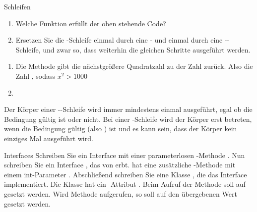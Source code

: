 \documentclass{../tuda-exercise}
\begin{document}
  \begin{task}[credit=\stars{1}{3}]{Schleifen}
    

    \begin{enumerate}
      [label=(\arabic*)]
      \item Welche Funktion erfüllt der oben stehende Code?
      \item Ersetzen Sie die -Schleife einmal durch eine - und
      einmal durch eine --Schleife, und zwar so, dass weiterhin
      die gleichen Schritte ausgeführt werden.
    \end{enumerate}

    \begin{solution}
      \begin{enumerate}
        [label=(\arabic*)]
        \item Die Methode gibt die nächstgrößere Quadratzahl zu der Zahl  zurück.
        Also die Zahl , sodass \(x^2 > 1000\)
        \item \noindent
        
        
      \end{enumerate}

      \begin{note}[title=Information:]
        Der Körper einer --Schleife wird immer mindestens einmal
        ausgeführt, egal ob die Bedingung gültig ist oder nicht. Bei einer
        -Schleife wird der Körper erst betreten, wenn die Bedingung gültig
        (also ) ist und es kann sein, dass der Körper kein einziges Mal
        ausgeführt wird.
      \end{note}
    \end{solution}
  \end{task}


  \clearpagesolution

  \begin{task}[credit=\stars{1}{3}]{Interfaces}
    Schreiben Sie ein Interface  mit einer parameterlosen
    -Methode . Nun schreiben Sie ein Interface ,
    das von  erbt.  hat eine zusätzliche -Methode
     mit einem \textcolor{keywordcolor}{int}-Parameter .
    Abschließend schreiben Sie eine Klasse , die das Interface 
    implementiert. Die Klasse hat ein -Attribut . Beim Aufruf
    der Methode  soll  auf  gesetzt werden. Wird
    Methode  aufgerufen, so soll  auf den übergebenen Wert
    gesetzt werden.

    \begin{solution}
      
    \end{solution}
  \end{task}
\end{document}

